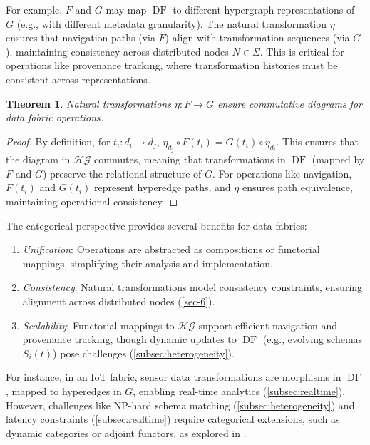 \documentclass{amsart}
\newtheorem{thm}{Theorem}
\DeclareMathOperator\DF{DF}
\begin{document}
For example, \( F \) and \( G \) may map \( \DF \) to different hypergraph representations of \( G \) (e.g., with different metadata granularity). The natural transformation \( \eta \) ensures that navigation paths (via \( F \)) align with transformation sequences (via \( G \)), maintaining consistency across distributed nodes \( N \in \Sigma \). This is critical for operations like provenance tracking, where transformation histories must be consistent across representations.

\begin{thm}
Natural transformations \( \eta: F \to G \) ensure commutative diagrams for data fabric operations.
\end{thm}

\begin{proof}
By definition, for \( t_i: d_i \to d_j \), \( \eta_{d_j} \circ F(t_i) = G(t_i) \circ \eta_{d_i} \). This ensures that the diagram in \( \mathcal{HG} \) commutes, meaning that transformations in \( \DF \) (mapped by \( F \) and \( G \)) preserve the relational structure of \( G \). For operations like navigation, \( F(t_i) \) and \( G(t_i) \) represent hyperedge paths, and \( \eta \) ensures path equivalence, maintaining operational consistency.
\end{proof}


The categorical perspective provides several benefits for data fabrics:
\begin{enumerate}
    \item \emph{Unification}: Operations are abstracted as compositions or functorial mappings, simplifying their analysis and implementation.
    \item \emph{Consistency}: Natural transformations model consistency constraints, ensuring alignment across distributed nodes (\cref{sec-6}).
    \item \emph{Scalability}: Functorial mappings to \( \mathcal{HG} \) support efficient navigation and provenance tracking, though dynamic updates to \( \DF \) (e.g., evolving schemas \( S_i(t) \)) pose challenges (\cref{subsec:heterogeneity}).
\end{enumerate}

For instance, in an IoT fabric, sensor data transformations are morphisms in \( \DF \), mapped to hyperedges in \( G \), enabling real-time analytics (\cref{subsec:realtime}). However, challenges like NP-hard schema matching (\cref{subsec:heterogeneity}) and latency constraints (\cref{subsec:realtime}) require categorical extensions, such as dynamic categories or adjoint functors, as explored in \cite{Spivak2014}.
\end{document}
